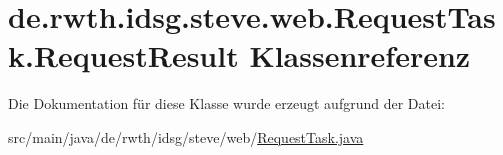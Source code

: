 \hypertarget{classde_1_1rwth_1_1idsg_1_1steve_1_1web_1_1_request_task_1_1_request_result}{\section{de.\-rwth.\-idsg.\-steve.\-web.\-Request\-Task.\-Request\-Result Klassenreferenz}
\label{classde_1_1rwth_1_1idsg_1_1steve_1_1web_1_1_request_task_1_1_request_result}
}


Die Dokumentation für diese Klasse wurde erzeugt aufgrund der Datei\-:\begin{DoxyCompactItemize}
\item 
src/main/java/de/rwth/idsg/steve/web/\hyperlink{_request_task_8java}{Request\-Task.\-java}\end{DoxyCompactItemize}
